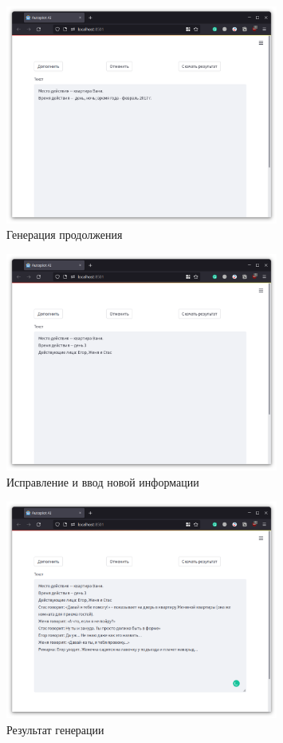 \begin{figure}[H]
    \centering
    \includegraphics[width=0.8\textwidth]{../inc/images/demo-3.png}
    \caption{Генерация продолжения}
    \label{fig:demo-3}
\end{figure}
\begin{figure}[H]
    \centering
    \includegraphics[width=0.8\textwidth]{../inc/images/demo-4.png}
    \caption{Исправление и ввод новой информации}
    \label{fig:demo-4}
\end{figure}
\begin{figure}[H]
    \centering
    \includegraphics[width=0.8\textwidth]{../inc/images/demo-5.png}
    \caption{Результат генерации}
    \label{fig:demo-5}
\end{figure}

